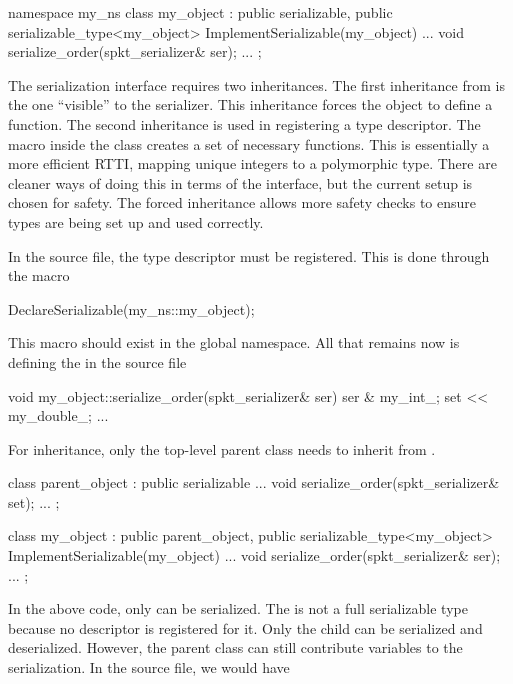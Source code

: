 \begin{CppCode}
namespace my_ns {
class my_object : 
  public serializable,
  public serializable_type<my_object>
{
 ImplementSerializable(my_object)
 ...
 void
 serialize_order(spkt_serializer& ser);
 ...
};
}
\end{CppCode}
The serialization interface requires two inheritances.
The first inheritance from  is the one ``visible'' to the serializer.
This inheritance forces the object to define a  function.
The second inheritance is used in registering a type descriptor.
The macro  inside the class creates a set of necessary functions.
This is essentially a more efficient RTTI, mapping unique integers to a polymorphic type.
There are cleaner ways of doing this in terms of the interface,
but the current setup is chosen for safety.
The forced inheritance allows more safety checks to ensure types are being set up and used correctly.

In the source file, the type descriptor must be registered.
This is done through the macro

\begin{CppCode}
DeclareSerializable(my_ns::my_object);
\end{CppCode}
This macro should exist in the global namespace.
All that remains now is defining the  in the source file

\begin{CppCode}
void
my_object::serialize_order(spkt_serializer& ser)
{
  ser & my_int_;
  set << my_double_;
  ...
}
\end{CppCode}

For inheritance, only the top-level parent class needs to inherit from .

\begin{CppCode}
class parent_object : 
  public serializable
{
...
  void
  serialize_order(spkt_serializer& set);
...
};

class my_object :
  public parent_object,
  public serializable_type<my_object>
{
 ImplementSerializable(my_object)
 ...
 void
 serialize_order(spkt_serializer& ser);
 ...
};
\end{CppCode}
In the above code, only  can be serialized.
The  is not a full serializable type because no descriptor is registered for it.
Only the child can be serialized and deserialized.
However, the parent class can still contribute variables to the serialization.
In the source file, we would have

